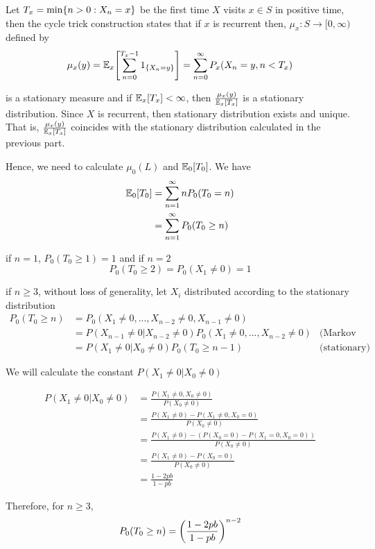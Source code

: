 \documentclass{article}
\begin{document}
Let $T_x = \min\set{n > 0: X_n = x}$ be the first time $X$ visits $x \in S$ in positive time, then the cycle trick construction states that if $x$ is recurrent then, $\mu_x: S \to [0,\infty)$ defined by 
$$
    \mu_x(y) = \Exp_x\bracket*{\sum_{n=0}^{T_x - 1} 1_{\set{X_n = y}}} = \sum_{n=0}^\infty P_x(X_n = y, n < T_x)
$$

is a stationary measure and if $\Exp_x[T_x] < \infty$, then $\frac{\mu_x(y)}{\Exp_x[T_x]}$ is a stationary distribution. Since $X$ is recurrent, then stationary distribution exists and unique. That is, $\frac{\mu_x(y)}{\Exp_x[T_x]}$ coincides with the stationary distribution calculated in the previous part.

Hence, we need to calculate $\mu_0(L)$ and $\Exp_0[T_0]$. We have
\begin{align*}
    \Exp_0[T_0]
    &= \sum_{n=1}^\infty n P_0(T_0 = n) \\
    &= \sum_{n=1}^\infty P_0(T_0 \geq n) \\
\end{align*}

if $n = 1$, $P_0(T_0 \geq 1) = 1$ and if $n = 2$
$$
    P_0(T_0 \geq 2) = P_0(X_1 \neq 0) = 1
$$

if $n \geq 3$, without loss of generality, let $X_i$ distributed according to the stationary distribution
\begin{align*}
    P_0(T_0 \geq n)
    &= P_0(X_1 \neq 0, ..., X_{n-2} \neq 0, X_{n-1} \neq 0) \\
    &= P(X_{n-1} \neq 0 | X_{n-2} \neq 0) P_0(X_1 \neq 0, ..., X_{n-2} \neq 0) &\text{(Markov property)}\\
    &= P(X_1 \neq 0 | X_0 \neq 0) P_0(T_0 \geq n-1) &\text{(stationary)}
\end{align*}

We will calculate the constant $P(X_1 \neq 0 | X_0 \neq 0)$

\begin{align*}
    P(X_1 \neq 0 | X_0 \neq 0)
    &= \frac{P(X_1 \neq 0, X_0 \neq 0)}{P(X_0 \neq 0)} \\
    &= \frac{P(X_1 \neq 0) - P(X_1 \neq 0, X_0 = 0)}{P(X_0 \neq 0)} \\
    &= \frac{P(X_1 \neq 0) - (P(X_0 = 0) - P(X_1 = 0, X_0 = 0))}{P(X_0 \neq 0)} \\
    &= \frac{P(X_1 \neq 0) - P(X_0 = 0)}{P(X_0 \neq 0)} \\
    &= \frac{1 - 2pb}{1-pb}
\end{align*}

Therefore, for $n \geq 3$,
$$
    P_0(T_0 \geq n) =  \tuple*{\frac{1 - 2pb}{1-pb}}^{n-2}
$$
\end{document}
